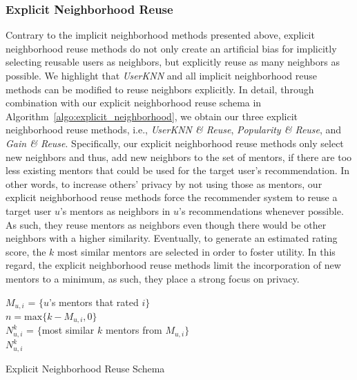 \documentclass[manuscript,review,anonymous]{acmart}
\begin{document}
\subsubsection{Explicit Neighborhood Reuse}
Contrary to the implicit neighborhood methods presented above, explicit neighborhood reuse methods do not only create an artificial bias for implicitly selecting reusable users as neighbors, but explicitly reuse as many neighbors as possible.
We highlight that \emph{UserKNN} and all implicit neighborhood reuse methods can be modified to reuse neighbors explicitly.
In detail, through combination with our explicit neighborhood reuse schema in Algorithm~\ref{algo:explicit_neighborhood}, we obtain our three explicit neighborhood reuse methods, i.e., \emph{UserKNN \& Reuse}, \emph{Popularity \& Reuse}, and \emph{Gain \& Reuse}.
Specifically, our explicit neighborhood reuse methods only select new neighbors and thus, add new neighbors to the set of mentors, if there are too less existing mentors that could be used for the target user's recommendation.
In other words, to increase others' privacy by not using those as mentors, our explicit neighborhood reuse methods force the recommender system to reuse a target user $u$'s mentors as neighbors in $u$'s recommendations whenever possible.
As such, they reuse mentors as neighbors even though there would be other neighbors with a higher similarity.
Eventually, to generate an estimated rating score, the $k$ most similar mentors are selected in order to foster utility.
In this regard, the explicit neighborhood reuse methods limit the incorporation of new mentors to a minimum, as such, they place a strong focus on privacy.

\begin{algorithm}[!htb]
    \SetAlgoLined
    \DontPrintSemicolon
    $M_{u, i}$ = $\{u$'s mentors that rated $i\}$ \\
    $n = \mathrm{max}\{k - M_{u, i}, 0\}$ \\
    $N^k_{u, i}$ = $\{$most similar $k$ mentors from $M_{u, i}\}$ \\
    \Return $N^k_{u, i}$
    \caption{Explicit Neighborhood Reuse Schema}
    \label{algo:explicit_neighborhood}
\end{algorithm}
\end{document}
